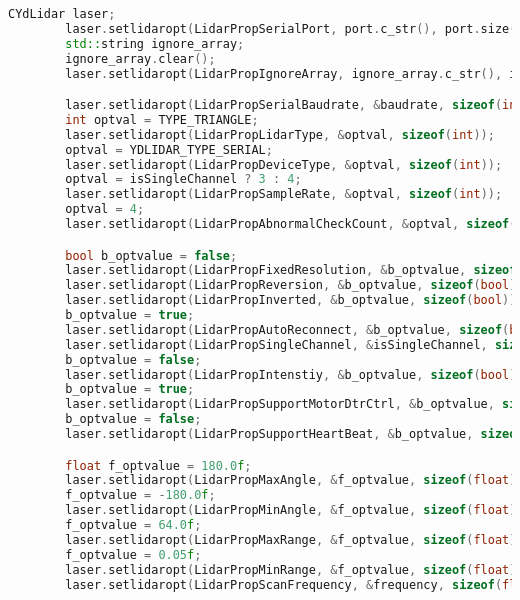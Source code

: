     \begin{lstlisting}[language={C++}, caption={Configuraci\'on de opciones del LiDAR}, label={Script}]
        CYdLidar laser;
        laser.setlidaropt(LidarPropSerialPort, port.c_str(), port.size());
        std::string ignore_array;
        ignore_array.clear();
        laser.setlidaropt(LidarPropIgnoreArray, ignore_array.c_str(), ignore_array.size());

        laser.setlidaropt(LidarPropSerialBaudrate, &baudrate, sizeof(int));
        int optval = TYPE_TRIANGLE;
        laser.setlidaropt(LidarPropLidarType, &optval, sizeof(int));
        optval = YDLIDAR_TYPE_SERIAL;
        laser.setlidaropt(LidarPropDeviceType, &optval, sizeof(int));
        optval = isSingleChannel ? 3 : 4;
        laser.setlidaropt(LidarPropSampleRate, &optval, sizeof(int));
        optval = 4;
        laser.setlidaropt(LidarPropAbnormalCheckCount, &optval, sizeof(int));

        bool b_optvalue = false;
        laser.setlidaropt(LidarPropFixedResolution, &b_optvalue, sizeof(bool));
        laser.setlidaropt(LidarPropReversion, &b_optvalue, sizeof(bool));
        laser.setlidaropt(LidarPropInverted, &b_optvalue, sizeof(bool));
        b_optvalue = true;
        laser.setlidaropt(LidarPropAutoReconnect, &b_optvalue, sizeof(bool));
        laser.setlidaropt(LidarPropSingleChannel, &isSingleChannel, sizeof(bool));
        b_optvalue = false;
        laser.setlidaropt(LidarPropIntenstiy, &b_optvalue, sizeof(bool));
        b_optvalue = true;
        laser.setlidaropt(LidarPropSupportMotorDtrCtrl, &b_optvalue, sizeof(bool));
        b_optvalue = false;
        laser.setlidaropt(LidarPropSupportHeartBeat, &b_optvalue, sizeof(bool));

        float f_optvalue = 180.0f;
        laser.setlidaropt(LidarPropMaxAngle, &f_optvalue, sizeof(float));
        f_optvalue = -180.0f;
        laser.setlidaropt(LidarPropMinAngle, &f_optvalue, sizeof(float));
        f_optvalue = 64.0f;
        laser.setlidaropt(LidarPropMaxRange, &f_optvalue, sizeof(float));
        f_optvalue = 0.05f;
        laser.setlidaropt(LidarPropMinRange, &f_optvalue, sizeof(float));
        laser.setlidaropt(LidarPropScanFrequency, &frequency, sizeof(float));

    \end{lstlisting}
    \vskip 0.5cm
